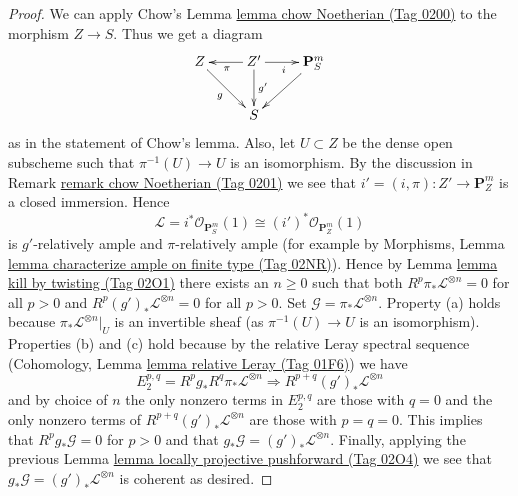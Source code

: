 \documentclass{amsart}
\theoremstyle{plain}
\theoremstyle{definition}
\theoremstyle{remark}
\numberwithin{equation}{subsection}
\begin{document}
\begin{proof}
\medskip\noindent
We can apply Chow's Lemma \href{https://stacks.math.columbia.edu/tag/0200}{lemma chow Noetherian (Tag 0200)}
to the morphism $Z \to S$. Thus we get a diagram
$$
\xymatrix{
Z \ar[rd]_g & Z' \ar[d]^-{g'} \ar[l]^\pi \ar[r]_i & \mathbf{P}^m_S \ar[dl] \\
& S &
}
$$
as in the statement of Chow's lemma. Also, let $U \subset Z$ be
the dense open subscheme such that $\pi^{-1}(U) \to U$ is an isomorphism.
By the discussion in Remark \href{https://stacks.math.columbia.edu/tag/0201}{remark chow Noetherian (Tag 0201)} we see that
$i' = (i, \pi) : Z' \to \mathbf{P}^m_Z$ is
a closed immersion. Hence
$$
\mathcal{L} = i^*\mathcal{O}_{\mathbf{P}^m_S}(1) \cong
(i')^*\mathcal{O}_{\mathbf{P}^m_Z}(1)
$$
is $g'$-relatively ample and $\pi$-relatively ample (for example by
Morphisms, Lemma \href{https://stacks.math.columbia.edu/tag/02NR}{lemma characterize ample on finite type (Tag 02NR)}).
Hence by Lemma \href{https://stacks.math.columbia.edu/tag/02O1}{lemma kill by twisting (Tag 02O1)}
there exists an $n \geq 0$ such that
both $R^p\pi_*\mathcal{L}^{\otimes n} = 0$ for all $p > 0$ and
$R^p(g')_*\mathcal{L}^{\otimes n} = 0$ for all $p > 0$.
Set $\mathcal{G} = \pi_*\mathcal{L}^{\otimes n}$.
Property (a) holds because $\pi_*\mathcal{L}^{\otimes n}|_U$ is
an invertible sheaf (as $\pi^{-1}(U) \to U$ is an isomorphism).
Properties (b) and (c) hold because by the relative Leray
spectral sequence
(Cohomology, Lemma \href{https://stacks.math.columbia.edu/tag/01F6}{lemma relative Leray (Tag 01F6)})
we have
$$
E_2^{p, q} = R^pg_* R^q\pi_*\mathcal{L}^{\otimes n}
\Rightarrow
R^{p + q}(g')_*\mathcal{L}^{\otimes n}
$$
and by choice of $n$ the only nonzero terms in $E_2^{p, q}$ are
those with $q = 0$ and the only nonzero terms of
$R^{p + q}(g')_*\mathcal{L}^{\otimes n}$ are those with $p = q = 0$.
This implies that $R^pg_*\mathcal{G} = 0$ for $p > 0$ and
that $g_*\mathcal{G} = (g')_*\mathcal{L}^{\otimes n}$.
Finally, applying the previous
Lemma \href{https://stacks.math.columbia.edu/tag/02O4}{lemma locally projective pushforward (Tag 02O4)}
we see that $g_*\mathcal{G} = (g')_*\mathcal{L}^{\otimes n}$ is
coherent as desired.
\end{proof}
\end{document}
